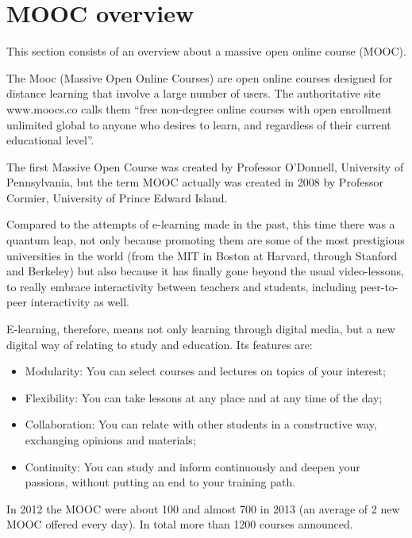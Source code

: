 \section{MOOC overview}
\label{sec:mooc_overview}

This section consists of an overview about a massive open online course (MOOC).

The Mooc (Massive Open Online Courses) are open online courses designed for distance learning that involve a large number of users.
The authoritative site www.moocs.co calls them “free non-degree online courses with open enrollment unlimited global to anyone who desires to learn, and regardless of their current educational level”. \cite{mooc_def}

The first Massive Open Course was created by Professor O'Donnell, University of Pennsylvania, but the term MOOC actually was created in 2008 by Professor Cormier, University of Prince Edward Island.


Compared to the attempts of e-learning made in the past, this time there was a quantum leap, not only because promoting them are some of the most prestigious universities in the world (from the MIT in Boston at Harvard, through Stanford and Berkeley) but also because it has finally gone beyond the usual video-lessons, to really embrace interactivity between teachers and students, including peer-to-peer interactivity as well.

E-learning, therefore, means not only learning through digital media, but a new digital way of relating to study and education.
Its features are:
\begin{itemize}
\item Modularity: You can select courses and lectures on topics of your interest;
\item Flexibility: You can take lessons at any place and at any time of the day;
\item Collaboration: You can relate with other students in a constructive way, exchanging opinions and materials;
\item Continuity: You can study and inform continuously and deepen your passions, without putting an end to your training path.
\end{itemize}

In 2012 the MOOC were about 100 and almost 700 in 2013 (an average of 2 new MOOC offered every day). In total more than 1200 courses announced.


